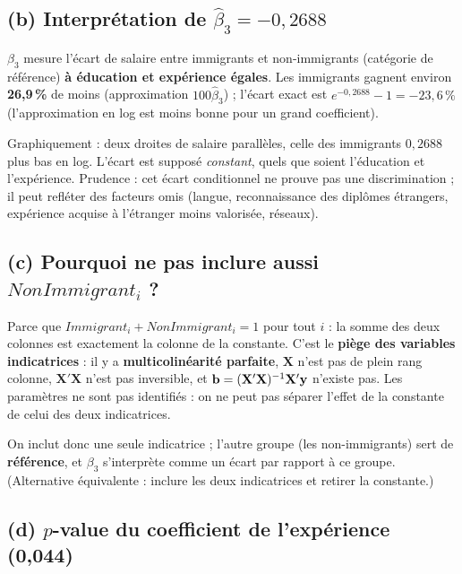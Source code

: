 \documentclass[11pt,a4paper]{article}
\newcommand{\vy}{\mathbf{y}}\newcommand{\vX}{\mathbf{X}}\newcommand{\vZ}{\mathbf{Z}}
\begin{document}
\subsection*{(b) Interprétation de $\hat\beta_3=-0{,}2688$}

\begin{reponse}
$\beta_3$ mesure l'écart de salaire entre immigrants et non-immigrants (catégorie de référence) \textbf{à éducation et expérience égales}. Les immigrants gagnent environ \textbf{26,9\,\%} de moins (approximation $100\hat\beta_3$) ; l'écart exact est $e^{-0{,}2688}-1=-23{,}6\,\%$ (l'approximation en log est moins bonne pour un grand coefficient).

Graphiquement : deux droites de salaire parallèles, celle des immigrants $0{,}2688$ plus bas en log. L'écart est supposé \emph{constant}, quels que soient l'éducation et l'expérience. Prudence : cet écart conditionnel ne prouve pas une discrimination ; il peut refléter des facteurs omis (langue, reconnaissance des diplômes étrangers, expérience acquise à l'étranger moins valorisée, réseaux).
\end{reponse}

\subsection*{(c) Pourquoi ne pas inclure aussi $NonImmigrant_i$ ?}

\begin{reponse}
Parce que $Immigrant_i+NonImmigrant_i=1$ pour tout $i$ : la somme des deux colonnes est exactement la colonne de la constante. C'est le \textbf{piège des variables indicatrices} : il y a \textbf{multicolinéarité parfaite}, $\vX$ n'est pas de plein rang colonne, $\vX'\vX$ n'est pas inversible, et $\vb=(\vX'\vX)^{-1}\vX'\vy$ n'existe pas. Les paramètres ne sont pas identifiés : on ne peut pas séparer l'effet de la constante de celui des deux indicatrices.

On inclut donc une seule indicatrice ; l'autre groupe (les non-immigrants) sert de \textbf{référence}, et $\beta_3$ s'interprète comme un écart par rapport à ce groupe. (Alternative équivalente : inclure les deux indicatrices et retirer la constante.)
\end{reponse}

\subsection*{(d) $p$-value du coefficient de l'expérience (0,044)}
\end{document}
